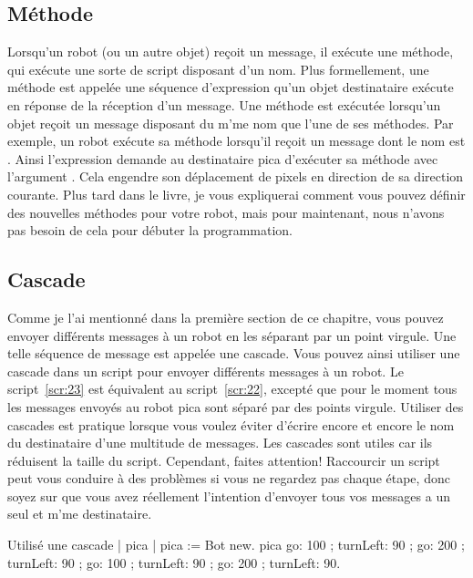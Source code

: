 \documentclass[a4paper,10pt,twoside]{book}
\begin{document}
\subsection{M\'ethode}

Lorsqu'un robot (ou un autre objet) re\c coit un message, il ex\'ecute une m\'ethode, qui ex\'ecute une sorte de script disposant d'un nom. Plus formellement, une m\'ethode est appel\'ee une s\'equence d'expression qu'un objet destinataire ex\'ecute en r\'eponse de la r\'eception d'un message. Une m\'ethode est ex\'ecut\'ee lorsqu'un objet re\c coit un message disposant du m'me nom que l'une de ses m\'ethodes. Par exemple, un robot ex\'ecute sa m\'ethode  lorsqu'il re\c coit un message dont le nom est . Ainsi l'expression  demande au destinataire pica d'ex\'ecuter sa m\'ethode avec l'argument . Cela engendre son d\'eplacement de  pixels en direction de sa direction courante. Plus tard dans le livre, je vous expliquerai comment vous pouvez d\'efinir des nouvelles m\'ethodes pour votre robot, mais pour maintenant, nous n'avons pas besoin de cela pour d\'ebuter la programmation.

\subsection{Cascade}

Comme je l'ai mentionn\'e dans la premi\`ere section de ce chapitre, vous pouvez envoyer diff\'erents messages \`a un robot en les s\'eparant par un point virgule. Une telle s\'equence de message est appel\'ee une cascade. Vous pouvez ainsi utiliser une cascade dans un script pour envoyer diff\'erents messages \`a un robot. Le script~\ref{scr:23} est \'equivalent au script~\ref{scr:22}, except\'e que pour le moment tous les messages envoy\'es au robot pica sont s\'epar\'e par des points virgule. Utiliser des cascades est pratique lorsque vous voulez \'eviter d'\'ecrire encore et encore le nom du destinataire d'une multitude de messages. Les cascades sont utiles car ils r\'eduisent la taille du script. Cependant, faites attention! Raccourcir un script peut vous conduire \`a des probl\`emes si vous ne regardez pas chaque \'etape, donc soyez sur que vous avez r\'eellement l'intention d'envoyer tous vos messages a un seul et m'me destinataire.

\begin{script}[23]{Utilis\'e une cascade}
| pica | 
pica := Bot new. 
pica 
   go: 100 ; turnLeft: 90 ; go: 200 ; turnLeft: 90 ; 
   go: 100 ; turnLeft: 90 ; go: 200 ; turnLeft: 90. 
\end{script}
\end{document}
